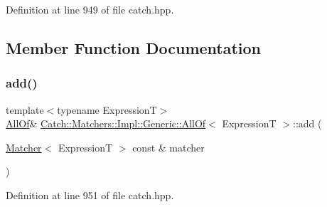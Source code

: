 Definition at line 949 of file catch.\+hpp.



\subsection{Member Function Documentation}
\hypertarget{class_catch_1_1_matchers_1_1_impl_1_1_generic_1_1_all_of_a8c5cd1e494ab697076da418ee72ac297}{}\label{class_catch_1_1_matchers_1_1_impl_1_1_generic_1_1_all_of_a8c5cd1e494ab697076da418ee72ac297} 
\subsubsection{\texorpdfstring{add()}{add()}}
{\footnotesize\ttfamily template$<$typename ExpressionT$>$ \\
\hyperlink{class_catch_1_1_matchers_1_1_impl_1_1_generic_1_1_all_of}{All\+Of}\& \hyperlink{class_catch_1_1_matchers_1_1_impl_1_1_generic_1_1_all_of}{Catch\+::\+Matchers\+::\+Impl\+::\+Generic\+::\+All\+Of}$<$ ExpressionT $>$\+::add (\begin{DoxyParamCaption}\item[{\hyperlink{struct_catch_1_1_matchers_1_1_impl_1_1_matcher}{Matcher}$<$ ExpressionT $>$ const \&}]{matcher }\end{DoxyParamCaption})\hspace{0.3cm}{\ttfamily [inline]}}



Definition at line 951 of file catch.\+hpp.

